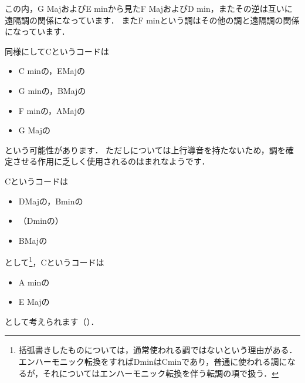 \documentclass[dvipdfmx,uplatex,b5paper,openany,jbase=12Q,nomag*,textwidth-limit=44%
               ]{gachimuchi}
\begin{document}
この内，G MajおよびE minから見たF MajおよびD min，またその逆は互いに遠隔調の関係になっています．
またF minという調はその他の調と遠隔調の関係になっています．

同様にしてC\Min というコードは
\begin{itemize}
  \item C minの\Gni\Min ，E\aFlat Majの\Gnvi\Min
  \item G minの\Gniv\Min ，B\aFlat Majの\Gnii\Min
  \item F minの\Gnv\Min ，A\aFlat Majの\Gniii\Min
  \item G Majの\Gniv\Min
\end{itemize}
という可能性があります．
ただし\Gnv\Min については上行導音を持たないため，調を確定させる作用に乏しく使用されるのはまれなようです．

C\Dimt というコードは
\begin{itemize}
  \item D\aFlat Majの\Gnvii\Dimt ，B\aFlat minの\Gnii\Dimt
  \item \<（D\aFlat minの\Gnvii\Dimt）
  \item B\aFlat Majの\Gnii\Dimt
\end{itemize}
として\footnote{%
括弧書きしたものについては，通常使われる調ではないという理由がある．
エンハーモニック転換をすればD\aFlat minはC\aSharp minであり，普通に使われる調になるが，それについてはエンハーモニック転換を伴う転調の項で扱う．
}，C\Aug というコードは
\begin{itemize}
  \item A minの\Gniii\Aug
  \item E Majの\bFlat\Gnvi\Aug
\end{itemize}
として考えられます（）．
\end{document}
